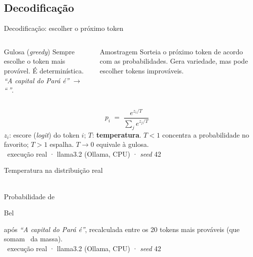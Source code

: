 \documentclass[aspectratio=169]{beamer}
\newcommand{\tk}[1]{{\setlength{\fboxsep}{1.6pt}\colorbox{mineblue!12}{\strut\ttfamily\footnotesize #1}}}
\newcommand{\real}{\textcolor{minegreen}{\tiny\faIcon{flask}\ execução real · llama3.2 (Ollama, CPU) · \textit{seed} 42}}
\begin{document}
\subsection{Decodificação}
\begin{frame}{Decodificação: escolher o próximo token}
    \begin{columns}
        \begin{block}{Gulosa (\textit{greedy})}
            \footnotesize Sempre escolhe o token mais provável. É determinística.\\[2pt]
            \textit{``A capital do Pará é''} $\to$ \textit{``\,\vGREEDY''}.
        \end{block}
        \pause
        \begin{block}{Amostragem}
            \footnotesize Sorteia o próximo token de acordo com as probabilidades. Gera variedade, mas pode escolher tokens improváveis.
        \end{block}
    \end{columns}
    \pause
    \[
      p_i \;=\; \frac{e^{z_i / T}}{\sum_j e^{z_j / T}}
    \]
    \footnotesize $z_i$: escore (\textit{logit}) do token $i$; $T$: \textbf{temperatura}. $T<1$ concentra a probabilidade no favorito; $T>1$ espalha. $T \to 0$ equivale à gulosa.\\
    \real
\end{frame}

\begin{frame}{Temperatura na distribuição real}
    \centering
    \\
    \footnotesize Probabilidade de \tk{\textvisiblespace{}Bel} após \textit{``A capital do Pará é''}, recalculada entre os 20 tokens mais prováveis (que somam \vMvinte\ da massa).\\
    \real
\end{frame}
\end{document}
